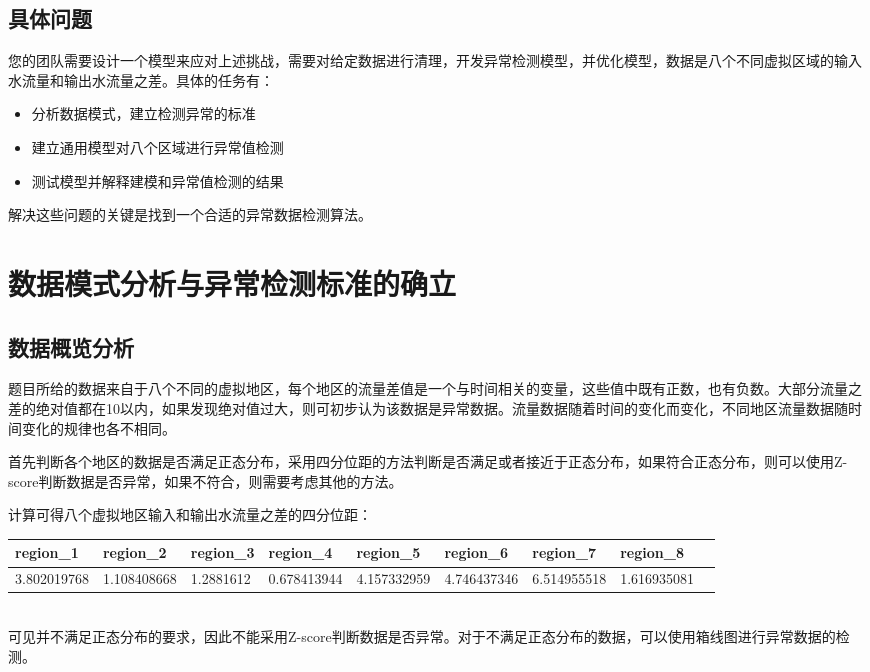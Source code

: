 \documentclass[UTF8]{article}
\begin{document}
		\subsection{具体问题}
		\par 您的团队需要设计一个模型来应对上述挑战，需要对给定数据进行清理，开发异常检测模型，并优化模型，数据是八个不同虚拟区域的输入水流量和输出水流量之差。具体的任务有：

		\begin{itemize}
			\item 分析数据模式，建立检测异常的标准
			\item 建立通用模型对八个区域进行异常值检测
			\item 测试模型并解释建模和异常值检测的结果
		\end{itemize}
		解决这些问题的关键是找到一个合适的异常数据检测算法。
	\section{数据模式分析与异常检测标准的确立}	
		\subsection{数据概览分析}
			\par 题目所给的数据来自于八个不同的虚拟地区，每个地区的流量差值是一个与时间相关的变量，这些值中既有正数，也有负数。大部分流量之差的绝对值都在10以内，如果发现绝对值过大，则可初步认为该数据是异常数据。流量数据随着时间的变化而变化，不同地区流量数据随时间变化的规律也各不相同。
			\par 首先判断各个地区的数据是否满足正态分布，采用四分位距的方法判断是否满足或者接近于正态分布，如果符合正态分布，则可以使用Z-score判断数据是否异常，如果不符合，则需要考虑其他的方法。
			\par 计算可得八个虚拟地区输入和输出水流量之差的四分位距：
			\begin{table}[!ht]
				\centering
				\resizebox{0.8\textwidth}{!}
				{
					\begin{tabular}{|l|l|l|l|l|l|l|l|l|}
					\hline
						region\_1 & region\_2 & region\_3 & region\_4 & region\_5 & region\_6 & region\_7 & region\_8 \\ \hline
						3.802019768 & 1.108408668 & 1.2881612 & 0.678413944 & 4.157332959 & 4.746437346 & 6.514955518 & 1.616935081 \\ \hline
					\end{tabular}
				}
			\end{table}
			\\可见并不满足正态分布的要求，因此不能采用Z-score判断数据是否异常。对于不满足正态分布的数据，可以使用箱线图进行异常数据的检测。
\end{document}
